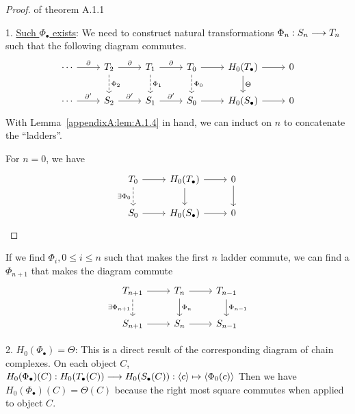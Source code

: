 \documentclass[11pt]{book} %
\begin{document}
\begin{proof}{of theorem A.1.1}

1. \underline{Such $\Phi_\bullet$ exists}: 
We need to construct natural transformations $\Phi_n:S_n\longrightarrow T_n$ such that the following diagram commutes.
\[\begin{tikzcd}
\cdots \arrow[r, "\pd"] & T_2 \arrow[r, "\pd"] \arrow[d, "\Phi_2", dashed] & T_1 \arrow[r, "\pd"] \arrow[d, "\Phi_1", dashed] & T_0 \arrow[r] \arrow[d, "\Phi_0", dashed] & H_0(T_\bullet) \arrow[r] \arrow[d, "\Theta"] & 0 \\
\cdots \arrow[r, "\pd'"] & S_2 \arrow[r, "\pd'"] & S_1 \arrow[r, "\pd'"] & S_0 \arrow[r] & H_0(S_\bullet) \arrow[r] & 0
\end{tikzcd}
\]
With Lemma~\ref{appendixA:lem:A.1.4} in hand, we can induct on $n$ to concatenate the ``ladders''.

For $n=0$, we have
\[
\begin{tikzcd}
T_0 \arrow[r] \arrow[d, "\exists \Phi_0"', dashed] & H_0(T_\bullet) \arrow[r] \arrow[d] & 0 \arrow[d] \\
S_0 \arrow[r] & H_0(S_\bullet) \arrow[r] & 0
\end{tikzcd}
\]
\end{proof}

If we find $\Phi_i, 0\leq i\leq n$ such that makes the first $n$ ladder commute, we can find a $\Phi_{n+1}$ that makes the diagram commute
\[
\begin{tikzcd}
T_{n+1} \arrow[r] \arrow[d, "\exists \Phi_{n+1}"', dashed] & T_n \arrow[r] \arrow[d, "\Phi_n"] & T_{n-1} \arrow[d, "\Phi_{n-1}"] \\
S_{n+1} \arrow[r] & S_n \arrow[r] & S_{n-1}
\end{tikzcd}
\]

2. \underline{$H_0(\Phi_\bullet)=\Theta$}: This is a direct result of the corresponding diagram of  chain complexes. On each object $C$, $H_0(\Phi_\bullet)(C): H_0(T_\bullet(C))\longrightarrow H_0(S_\bullet(C)):\langle c\rangle\mapsto \langle \Phi_0(c)\rangle$
Then we have $H_0(\Phi_\bullet)(C)=\Theta(C)$ because the right most square commutes when applied to object $C$.
\end{document}
